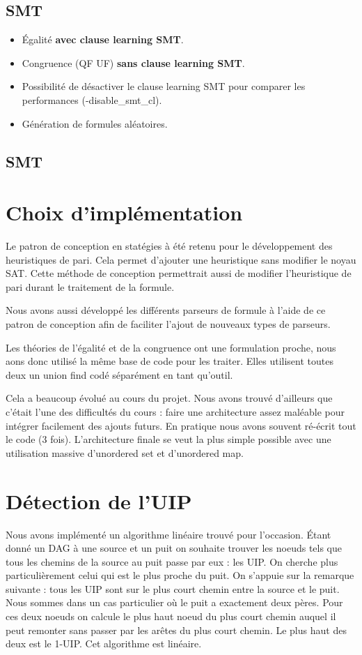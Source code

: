 \documentclass{article}
\begin{document}
\subsection{SMT}
\begin{itemize}
\item Égalité \textbf{avec clause learning SMT}.
\item Congruence (QF UF) \textbf{sans clause learning SMT}.
\item Possibilité de désactiver le clause learning SMT pour comparer les performances (-disable\_smt\_cl).
\item Génération de formules aléatoires.
\end{itemize}
\subsection{SMT}

\section{Choix d'implémentation}
Le patron de conception en statégies à été retenu pour le développement des heuristiques de pari. Cela permet d'ajouter une heuristique sans modifier le noyau SAT. 
Cette méthode de conception permettrait aussi de modifier l'heuristique de pari durant le traitement de la formule.

Nous avons aussi développé les différents parseurs de formule à l'aide de ce patron de conception afin de faciliter l'ajout de nouveaux types de parseurs.

Les théories de l'égalité et de la congruence ont une formulation proche, nous aons donc utilisé la même base de code pour les traiter.
Elles utilisent toutes deux un union find codé séparément en tant qu'outil.

Cela a beaucoup évolué au cours du projet. Nous avons trouvé d'ailleurs que c'était l'une des difficultés du cours : faire une architecture assez maléable pour intégrer facilement des ajouts futurs. En pratique nous avons souvent ré-écrit tout le code (3 fois).
L'architecture finale se veut la plus simple possible avec une utilisation massive d'unordered set et d'unordered map.

\section{Détection de l'UIP}
Nous avons implémenté un algorithme linéaire trouvé pour l'occasion. Étant donné un DAG à une source et un puit on souhaite trouver les noeuds tels que tous les chemins de la source au puit passe par eux : les UIP. On cherche plus particulièrement celui qui est le plus proche du puit.
On s'appuie sur la remarque suivante : tous les UIP sont sur le plus court chemin entre la source et le puit. \\
Nous sommes dans un cas particulier où le puit a exactement deux pères. Pour ces deux noeuds on calcule le plus haut noeud du plus court chemin auquel il peut remonter sans passer par les arêtes du plus court chemin. Le plus haut des deux est le 1-UIP. Cet algorithme est linéaire.
\end{document}
